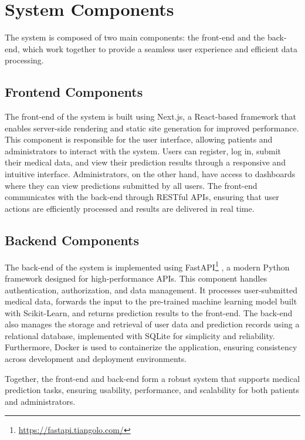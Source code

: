 \section{System Components}
The system is composed of two main components: the front-end and the back-end,
which work together to provide a seamless user experience and efficient data processing.

\subsection{Frontend Components}
The front-end of the system is built using Next.js, a React-based framework that
enables server-side rendering and static site generation for improved performance.
This component is responsible for the user interface, allowing patients and administrators
to interact with the system. Users can register, log in, submit their medical data, and view
their prediction results through a responsive and intuitive interface. Administrators,
on the other hand, have access to dashboards where they can view predictions submitted by all users.
The front-end communicates with the back-end through RESTful APIs,
ensuring that user actions are efficiently processed and results are delivered in real time.
\subsection{Backend Components}
The back-end of the system is implemented using FastAPI\footnote{\url{https://fastapi.tiangolo.com/}} 
, a modern Python framework
designed for high-performance APIs. This component handles authentication, authorization,
and data management. It processes user-submitted medical data,
forwards the input to the pre-trained machine learning model built with Scikit-Learn,
and returns prediction results to the front-end. The back-end also manages the storage and retrieval
of user data and prediction records using a relational database, implemented with SQLite for simplicity and reliability.
Furthermore, Docker is used to containerize the application, ensuring consistency across development and deployment environments.

Together, the front-end and back-end form a robust system that supports medical prediction tasks,
ensuring usability, performance, and scalability for both patients and administrators.
